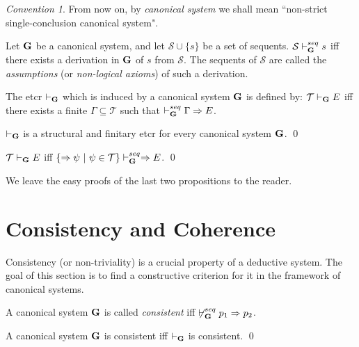\documentclass{LMCS}
\theoremstyle{remark}
\newtheorem*{convention}{Convention}
\newcommand{\Ss}{\mathcal{S}}
\newcommand{\T}{\mathcal{T}}
\newcommand{\G}{{\bf G}}
\newcommand{\Ra}{\Rightarrow}
\newcommand{\g}{\Gamma}
\newcommand{\vd}{\vdash}
\newcommand{\st}{{\ |\ }}   \newcommand{\til}{,\dots,}
\newcommand{\suq}{\subseteq}
\begin{document}
\begin{convention}
From now on, by {\em canonical system} 
we shall mean ``non-strict single-conclusion canonical system".
\end{convention}

\begin{defi}
\label{syntactic tcr}
Let ${\G}$ be a canonical system,
and let $\Ss \cup \{s\}$ be a set of sequents.
$\Ss\vd_{\G}^{seq} s$ iff there exists a derivation in ${\G}$ of $s$ from $\Ss$.
The sequents of $\Ss$ are called the {\em assumptions} (or {\em non-logical axioms}) of such a derivation.
\end{defi}



\begin{defi}
The etcr $\vd_{\G}$ 
which is induced by a canonical system ${\G}$ is defined by:
$\T\vd_{\G}E$ iff there exists a
finite $\g\suq\T$ such that $\vd_{\G}^{seq}\g\Ra E$.
\end{defi}

\begin{prop}
\label{structural finitary}
$\vd_{\G}$ is a structural and finitary etcr
for every canonical system $\G$.
\qed
\end{prop}

\begin{prop}
\label{reduction1}
$\T\vd_{\G} E$ iff
$\{\Ra\psi\st\psi\in\T\}\vd_{\G}^{seq}\Ra E$.
\qed
\end{prop}

We leave the easy proofs of the last two propositions to the reader.

\section{Consistency and Coherence}

Consistency (or non-triviality) is a crucial property of a deductive system. 
The goal of this section is to find a constructive criterion
for it in the framework of canonical systems.

\begin{defi}
\label{consistency}
A canonical system ${\G}$ is called {\em consistent} iff $\not\vd_{\G}^{seq} p_1 \Ra p_2$.
\end{defi}

\begin{prop}
\label{consistent proposition}
A canonical system $\G$ is consistent iff $\vd_{\G}$ is consistent.
\qed
\end{prop}
\end{document}
